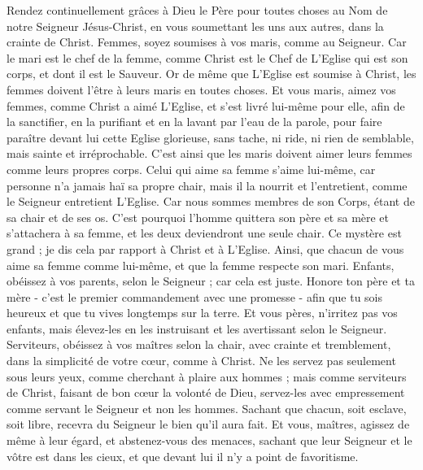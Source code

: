 \begin{multicols}{2}
Rendez continuellement grâces à Dieu le Père pour toutes choses au Nom de notre Seigneur Jésus-Christ,
en vous soumettant les uns aux autres, dans la crainte de Christ.
Femmes, soyez soumises à vos maris, comme au Seigneur.
Car le mari est le chef de la femme, comme Christ est le Chef de L’Eglise qui est son corps, et dont il est le Sauveur.
Or de même que L’Eglise est soumise à Christ, les femmes doivent l’être à leurs maris en toutes choses.
Et vous maris, aimez vos femmes, comme Christ a aimé L’Eglise, et s'est livré lui-même pour elle,
afin de la sanctifier, en la purifiant et en la lavant par l’eau de la parole,
pour faire paraître devant lui cette Eglise glorieuse, sans tache, ni ride, ni rien de semblable, mais sainte et irréprochable.
C’est ainsi que les maris doivent aimer leurs femmes comme leurs propres corps. Celui qui aime sa femme s'aime lui-même,
car personne n'a jamais haï sa propre chair, mais il la nourrit et l'entretient, comme le Seigneur entretient L’Eglise.
Car nous sommes membres de son Corps, étant de sa chair et de ses os.
C'est pourquoi l'homme quittera son père et sa mère et s’attachera à sa femme, et les deux deviendront une seule chair.
Ce mystère est grand ; je dis cela par rapport à Christ et à L’Eglise.
Ainsi, que chacun de vous aime sa femme comme lui-même, et que la femme respecte son mari.
\VerseOne{}Enfants, obéissez à vos parents, selon le Seigneur ; car cela est juste.
Honore ton père et ta mère - c’est le premier commandement avec une promesse -
afin que tu sois heureux et que tu vives longtemps sur la terre.
Et vous pères, n'irritez pas vos enfants, mais élevez-les en les instruisant et les avertissant selon le Seigneur.
Serviteurs, obéissez à vos maîtres selon la chair, avec crainte et tremblement, dans la simplicité de votre cœur, comme à Christ.
Ne les servez pas seulement sous leurs yeux, comme cherchant à plaire aux hommes ; mais comme serviteurs de Christ, faisant de bon cœur la volonté de Dieu,
servez-les avec empressement comme servant le Seigneur et non les hommes.
Sachant que chacun, soit esclave, soit libre, recevra du Seigneur le bien qu'il aura fait.
Et vous, maîtres, agissez de même à leur égard, et abstenez-vous des menaces, sachant que leur Seigneur et le vôtre est dans les cieux, et que devant lui il n'y a point de favoritisme.

\end{multicols}
